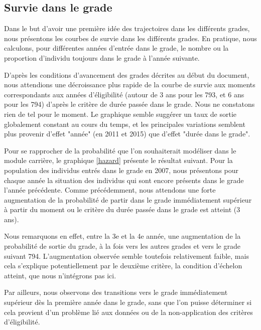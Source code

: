 \documentclass[11pt,a4paper]{article}
\begin{document}
\subsection{Survie dans le grade}


Dans le but d'avoir une première idée des trajectoires dans les différents grades, nous présentons les courbes de survie dans les différents grades. En pratique, nous calculons, pour différentes années d'entrée dans le grade, le nombre ou la proportion d'individu toujours dans le grade à l'année suivante. 

D'après les conditions d'avancement des grades décrites au début du document, nous attendions une décroissance plus rapide de la courbe de survie aux moments correspondants aux années d'éligibilité (autour de 3 ans pour les 793, et 6 ans pour les 794) d'après le critère de durée passée dans le grade. Nous ne constatons rien de tel pour le moment. Le graphique semble suggérer un taux de sortie globalement constant au cours du temps, et les principales variations semblent plus provenir d'effet "année" (en 2011 et 2015) que d'effet "durée dans le grade". 

\medskip

Pour se rapprocher de la probabilité que l'on souhaiterait modéliser dans le module carrière, le graphique \ref{hazard} présente le résultat suivant. Pour la population des individus entrés dans le grade en 2007, nous présentons pour chaque année la situation des individus qui sont encore présents dans le grade l'année précédente. Comme précédemment, nous attendons une forte augmentation de la probabilité de partir dans le grade immédiatement supérieur à partir du moment ou le critère du durée passée dans le grade est atteint (3 ans). 

Nous remarquons en effet, entre la 3e et la 4e année, une augmentation de la probabilité de sortie du grade, à la fois vers les autres grades et vers le grade suivant 794. L'augmentation observée semble toutefois relativement faible, mais cela s'explique potentiellement par le deuxième critère, la condition d'échelon atteint, que nous n'intégrons pas ici. 

Par ailleurs, nous observons des transitions vers le grade immédiatement supérieur dès la première année dans le grade, sans que l'on puisse déterminer si cela provient d'un problème lié aux données ou de la non-application des critères d'éligibilité. 
\end{document}
